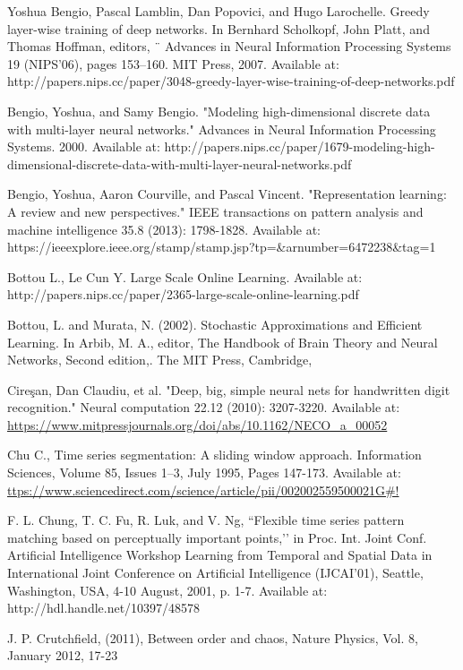 \documentclass[a4paper,latin]{paper}
\begin{document}
\begin{thebibliography}{bibliography}
Yoshua Bengio, Pascal Lamblin, Dan Popovici, and Hugo Larochelle. Greedy layer-wise training of deep networks. In Bernhard Scholkopf, John Platt, and Thomas Hoffman, editors, ¨ Advances in Neural Information Processing Systems 19 (NIPS’06), pages 153–160. MIT Press, 
2007. Available at: http://papers.nips.cc/paper/3048-greedy-layer-wise-training-of-deep-networks.pdf

Bengio, Yoshua, and Samy Bengio. "Modeling high-dimensional discrete data with multi-layer neural networks." Advances in Neural Information Processing Systems. 2000.
Available at: http://papers.nips.cc/paper/1679-modeling-high-dimensional-discrete-data-with-multi-layer-neural-networks.pdf

Bengio, Yoshua, Aaron Courville, and Pascal Vincent. "Representation learning: A review and new perspectives." IEEE transactions on pattern analysis and machine intelligence 35.8 (2013): 1798-1828.
Available at: https://ieeexplore.ieee.org/stamp/stamp.jsp?tp=\&arnumber=6472238\&tag=1

Bottou L., Le Cun Y. Large Scale Online Learning. Available at: http://papers.nips.cc/paper/2365-large-scale-online-learning.pdf

Bottou, L. and Murata, N. (2002). Stochastic Approximations and Efficient Learning. In Arbib, M. A., editor, The Handbook of Brain Theory and Neural Networks, Second edition,. The MIT Press, Cambridge, 

Cireşan, Dan Claudiu, et al. "Deep, big, simple neural nets for handwritten digit recognition." Neural computation 22.12 (2010): 3207-3220.
Available at: \url{https://www.mitpressjournals.org/doi/abs/10.1162/NECO_a_00052}

Chu C., Time series segmentation: A sliding window approach. Information Sciences, Volume 85, Issues 1–3, July 1995, Pages 
147-173. Available at: \url{ttps://www.sciencedirect.com/science/article/pii/002002559500021G#!}

 F. L. Chung, T. C. Fu, R. Luk, and V. Ng, “Flexible time series pattern matching based on perceptually important points,’’ in Proc. Int. Joint Conf. Artificial Intelligence Workshop  
 Learning from Temporal and Spatial Data in International Joint Conference on Artificial Intelligence (IJCAI'01), Seattle, Washington, USA, 4-10 August, 2001, p. 
 1-7. Available at: http://hdl.handle.net/10397/48578

J. P. Crutchfield, (2011), Between order and chaos, Nature Physics, Vol. 8, January 2012, 17-23


\end{thebibliography}
\end{document}
